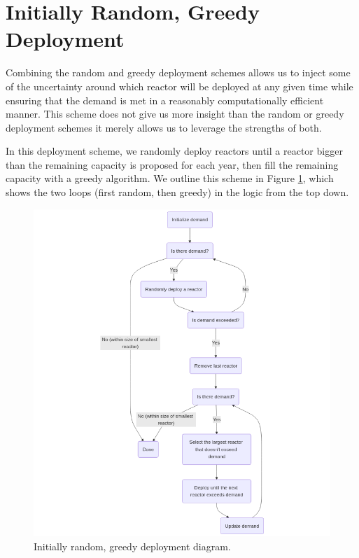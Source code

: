 \section{Initially Random, Greedy Deployment}
\label{sec:initially_random_greedy}

Combining the random and greedy deployment schemes allows us to inject some of
the uncertainty around which reactor will be deployed at any given time while
ensuring that the demand is met in a reasonably computationally efficient
manner. This scheme does not give us more insight than the random or greedy
deployment schemes it merely allows us to leverage the strengths of both.

In this deployment scheme, we randomly deploy reactors until a reactor bigger
than the remaining capacity is proposed for each year, then fill the remaining
capacity with a greedy algorithm. We outline this scheme in Figure
\ref{fig:init_random_greedy_diagram}, which shows the two loops (first random,
then greedy) in the logic from the top down.

\begin{figure}[H]
    \centering
    \includegraphics[scale=0.3]{images/schemes/random_greedy_diagram.png}
    \caption{Initially random, greedy deployment diagram.}
    \label{fig:init_random_greedy_diagram}
\end{figure}

